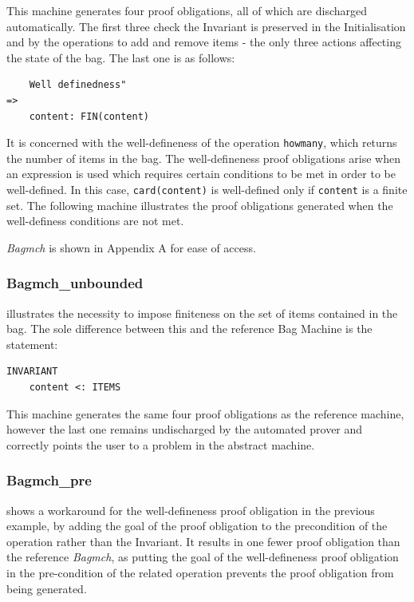 \documentclass[12pt,journal,duplex]{IEEEtran}
\begin{document}
	This machine generates four proof obligations, all of which are discharged automatically. The first three check the Invariant is preserved in the Initialisation and by the operations to add and remove items - the only three actions affecting the state of the bag. The last one is as follows:

\begin{lstlisting}
	Well definedness"
=>
	content: FIN(content)
\end{lstlisting}

	It is concerned with the well-defineness of the operation \texttt{howmany}, which returns the number of items in the bag. The well-defineness proof obligations arise when an expression is used which requires certain conditions to be met in order to be well-defined. In this case, \texttt{card(content)} is well-defined only if \texttt{content} is a finite set. The following machine illustrates the proof obligations generated when the well-definess conditions are not met.

	\emph{Bagmch} is shown in Appendix A for ease of access.

	\subsubsection{Bagmch\_unbounded} illustrates the necessity to impose finiteness on the set of items contained in the bag. The sole difference between this and the reference Bag Machine is the statement:

\begin{lstlisting}
INVARIANT
	content <: ITEMS
\end{lstlisting}
	This machine generates the same four proof obligations as the reference machine, however the last one remains undischarged by the automated prover and correctly points the user to a problem in the abstract machine.

	\subsubsection{Bagmch\_pre} shows a workaround for the well-defineness proof obligation in the previous example, by adding the goal of the proof obligation to the precondition of the operation rather than the Invariant. It results in one fewer proof obligation than the reference \emph{Bagmch}, as putting the goal of the well-defineness proof obligation in the pre-condition of the related operation prevents the proof obligation from being generated.
\end{document}
